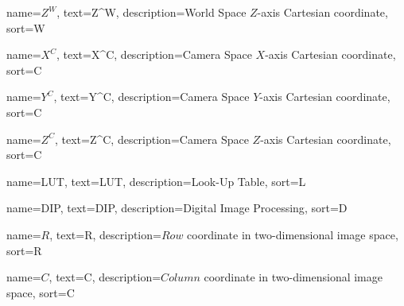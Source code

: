 %
{%
  name={$Z^W$},
  text={Z^W},
  description={World Space $Z$-axis Cartesian coordinate},
  sort={W}
}

%
{%
  name={$X^C$},
  text={X^C},
  description={Camera Space $X$-axis Cartesian coordinate},
  sort={C}
}

%
{%
  name={$Y^C$},
  text={Y^C},
  description={Camera Space $Y$-axis Cartesian coordinate},
  sort={C}
}

%
{%
  name={$Z^C$},
  text={Z^C},
  description={Camera Space $Z$-axis Cartesian coordinate},
  sort={C}
}

%
{%
  name={LUT},
  text={LUT},
  description={Look-Up Table},
  sort={L}
}

%
{%
  name={DIP},
  text={DIP},
  description={Digital Image Processing},
  sort={D}
}

%
{%
  name={$R$},
  text={R},
  description={$Row$ coordinate in two-dimensional image space},
  sort={R}
}

%
{%
  name={$C$},
  text={C},
  description={$Column$ coordinate in two-dimensional image space},
  sort={C}
}















